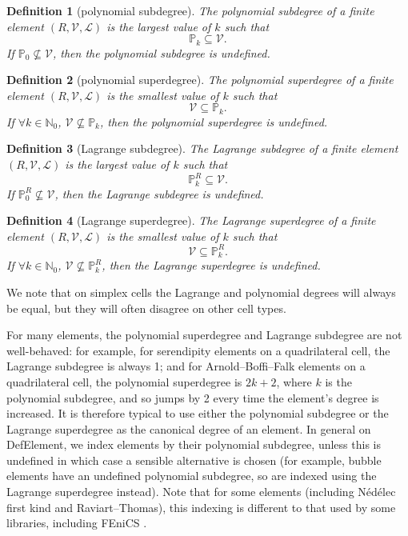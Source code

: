 \documentclass[sn-mathphys-num]{sn-jnl}%
\theoremstyle{thmstyleone}%
\newcommand{\refel}{R}
\newcommand{\polyspace}{\mathcal{V}}
\newcommand{\dualbasis}{\mathcal{L}}
\theoremstyle{thmstyletwo}%
\theoremstyle{thmstylethree}%
\newtheorem{definition}{Definition}%
\begin{document}
\begin{definition}[polynomial subdegree]\label{def:poly-sub}
The polynomial subdegree of a finite element $(\refel,\polyspace,\dualbasis)$ is the largest value of $k$ such that
$$\mathbb{P}_k\subseteq\polyspace.$$
If $\mathbb{P}_0\not\subseteq\polyspace$, then the polynomial subdegree is undefined.
\end{definition}

\begin{definition}[polynomial superdegree]\label{def:poly-super}
The polynomial superdegree of a finite element $(\refel,\polyspace,\dualbasis)$ is the smallest value of $k$ such that
$$\polyspace\subseteq\mathbb{P}_k.$$
If $\forall k\in\mathbb{N}_0$, $\polyspace\not\subseteq\mathbb{P}_k$, then the polynomial superdegree is undefined.
\end{definition}

\begin{definition}[Lagrange subdegree]\label{def:L-sub}
The Lagrange subdegree of a finite element $(\refel,\polyspace,\dualbasis)$ is the largest value of $k$ such that
$$\mathbb{P}^\refel_k\subseteq\polyspace.$$
If $\mathbb{P}^\refel_0\not\subseteq\polyspace$, then the Lagrange subdegree is undefined.
\end{definition}

\begin{definition}[Lagrange superdegree]\label{def:L-super}
The Lagrange superdegree of a finite element $(\refel,\polyspace,\dualbasis)$ is the smallest value of $k$ such that
$$\polyspace\subseteq\mathbb{P}^\refel_k.$$
If $\forall k\in\mathbb{N}_0$, $\polyspace\not\subseteq\mathbb{P}^\refel_k$, then the Lagrange superdegree is undefined.
\end{definition}

We note that on simplex cells the Lagrange and polynomial degrees will always be equal, but
they will often disagree on other cell types.

For many elements, the polynomial superdegree and Lagrange subdegree are not well-behaved:
for example, for serendipity elements \cite{serendipity} on a quadrilateral cell, the Lagrange subdegree is always 1;
and for Arnold--Boffi--Falk elements \cite{mapping2} on a quadrilateral cell, the polynomial superdegree is $2k+2$, where $k$ is the polynomial subdegree, and so jumps by 2 every time the element's
degree is increased.
It is therefore typical to use either the polynomial subdegree or the Lagrange superdegree
as the canonical degree of an element. In general on DefElement, we index elements by their polynomial subdegree, unless this is undefined in which case a sensible alternative is chosen
(for example, bubble elements have an undefined polynomial subdegree, so are indexed using the Lagrange superdegree instead).
Note that for some elements (including N\'ed\'elec first kind and Raviart--Thomas), this indexing is different to that used by some libraries, including FEniCS \cite{dolfinx,basix}.
\end{document}
